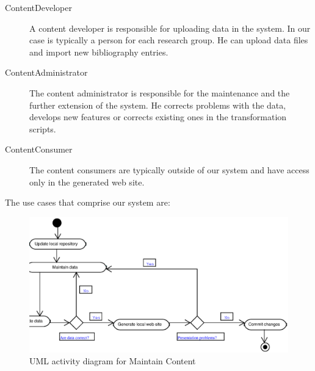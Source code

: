 \documentclass[10pt]{article}
\begin{document}
\begin{description}
\item[ContentDeveloper] A content developer is responsible for uploading data in the system. 
In our case is typically a person for each research group. He can upload data files and 
import new bibliography entries.

\item[ContentAdministrator] The content administrator is responsible for the maintenance 
and the further extension of the system. He corrects problems with the data, develops 
new features or corrects existing ones in the transformation scripts.

\item[ContentConsumer] The content consumers are typically outside of our system
and have access only in the generated web site.
\end{description}

The use cases that comprise our system are:

\begin{figure}
\includegraphics[scale=0.5]{maintain-content-activity}
\caption{UML activity diagram for Maintain Content}
\label{fig:maintain-content-diagram}
\end{figure}
\end{document}
